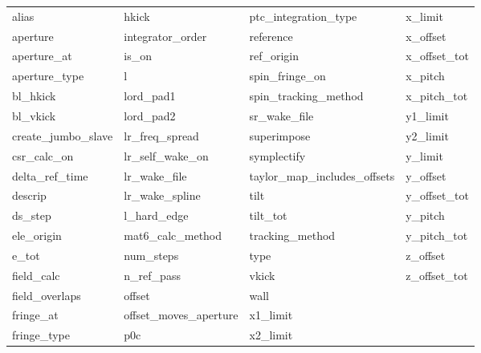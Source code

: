  \begin{tabular}{llll} \toprule
alias                       & hkick                       & ptc_integration_type        & x_limit                     \\
aperture                    & integrator_order            & reference                   & x_offset                    \\
aperture_at                 & is_on                       & ref_origin                  & x_offset_tot                \\
aperture_type               & l                           & spin_fringe_on              & x_pitch                     \\
bl_hkick                    & lord_pad1                   & spin_tracking_method        & x_pitch_tot                 \\
bl_vkick                    & lord_pad2                   & sr_wake_file                & y1_limit                    \\
create_jumbo_slave          & lr_freq_spread              & superimpose                 & y2_limit                    \\
csr_calc_on                 & lr_self_wake_on             & symplectify                 & y_limit                     \\
delta_ref_time              & lr_wake_file                & taylor_map_includes_offsets & y_offset                    \\
descrip                     & lr_wake_spline              & tilt                        & y_offset_tot                \\
ds_step                     & l_hard_edge                 & tilt_tot                    & y_pitch                     \\
ele_origin                  & mat6_calc_method            & tracking_method             & y_pitch_tot                 \\
e_tot                       & num_steps                   & type                        & z_offset                    \\
field_calc                  & n_ref_pass                  & vkick                       & z_offset_tot                \\
field_overlaps              & offset                      & wall                        &                             \\
fringe_at                   & offset_moves_aperture       & x1_limit                    &                             \\
fringe_type                 & p0c                         & x2_limit                    &                             \\
 \bottomrule
 \end{tabular}
 \vfill
 
